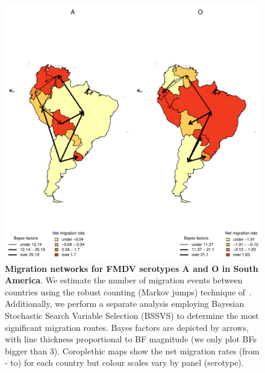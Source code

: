 \documentclass[10pt]{article}
\begin{document}
\begin{figure}[!ht]
\begin{center}
\includegraphics[scale=0.87]{FIGURES/PLOTS/MJandBFs.pdf}
\end{center}
\caption{\textbf{Migration networks for FMDV serotypes A and O in South America}.
We estimate the number of migration events between countries using the robust counting (Markov jumps) technique of~\cite{Minin2008b}.
Additionally, we perform a separate analysis employing Bayesian Stochastic Search Variable Selection (BSSVS) to determine the most significant migration routes.
Bayes factors are depicted by arrows, with line thickness proportional to BF magnitude (we only plot BFs bigger than $3$).
Coroplethic maps show the net migration rates (from - to) for each country but colour scales vary by panel (serotype).
}
\label{fig:mj&BFs}
\end{figure}
\end{document}
